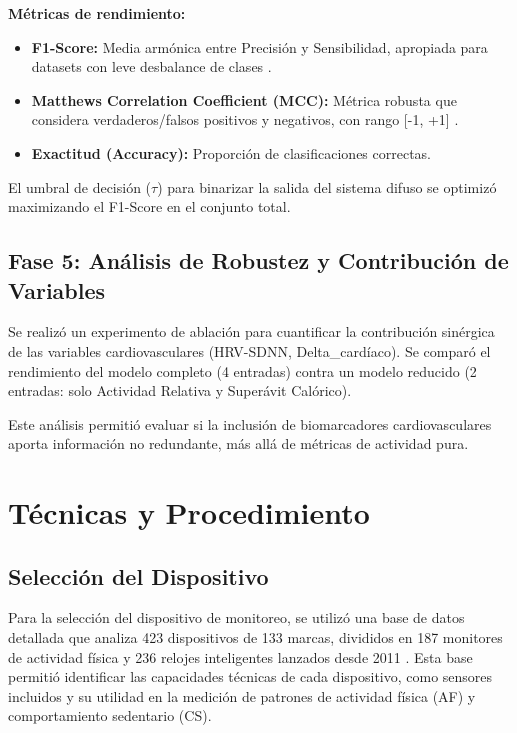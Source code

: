 \textbf{Métricas de rendimiento:}
\begin{itemize}
    \item \textbf{F1-Score:} Media armónica entre Precisión y Sensibilidad, apropiada para datasets con leve desbalance de clases \cite{Sokolova2009}.
    \item \textbf{Matthews Correlation Coefficient (MCC):} Métrica robusta que considera verdaderos/falsos positivos y negativos, con rango [-1, +1] \cite{Chicco2020}.
    \item \textbf{Exactitud (Accuracy):} Proporción de clasificaciones correctas.
\end{itemize}

El umbral de decisión ($\tau$) para binarizar la salida del sistema difuso se optimizó maximizando el F1-Score en el conjunto total.

\subsection{Fase 5: Análisis de Robustez y Contribución de Variables}
\label{subsec:fase5_robustez}

Se realizó un experimento de ablación para cuantificar la contribución sinérgica de las variables cardiovasculares (HRV-SDNN, Delta\_cardíaco). Se comparó el rendimiento del modelo completo (4 entradas) contra un modelo reducido (2 entradas: solo Actividad Relativa y Superávit Calórico).

Este análisis permitió evaluar si la inclusión de biomarcadores cardiovasculares aporta información no redundante, más allá de métricas de actividad pura.

\section{Técnicas y Procedimiento}
\label{sec:tecnicas_procedimiento}

\subsection{Selección del Dispositivo}
\label{subsec:seleccion_dispositivo}

Para la selección del dispositivo de monitoreo, se utilizó una base de datos detallada que analiza 423 dispositivos de 133 marcas, divididos en 187 monitores de actividad física y 236 relojes inteligentes lanzados desde 2011 \citep{Henriksen2021ReplicationData}. Esta base permitió identificar las capacidades técnicas de cada dispositivo, como sensores incluidos y su utilidad en la medición de patrones de actividad física (AF) y comportamiento sedentario (CS).

